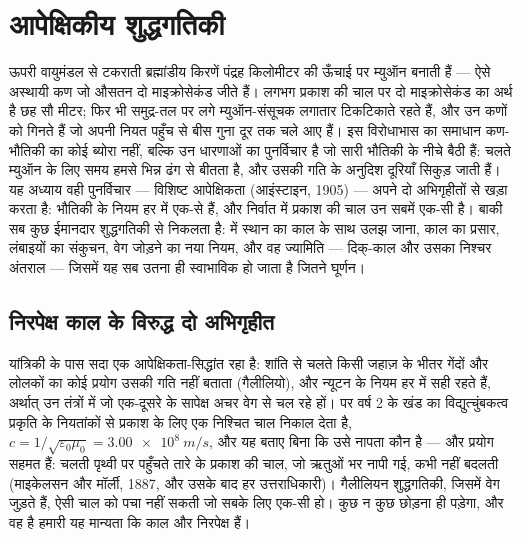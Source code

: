 \chapter{आपेक्षिकीय शुद्धगतिकी}\label{ch:b3:relativistic-kinematics}

ऊपरी वायुमंडल से टकराती ब्रह्मांडीय किरणें पंद्रह किलोमीटर की ऊँचाई पर
म्युऑन बनाती हैं --- ऐसे अस्थायी कण जो औसतन दो माइक्रोसेकंड जीते हैं।
लगभग प्रकाश की चाल पर दो माइक्रोसेकंड का अर्थ है
छह सौ मीटर; फिर भी समुद्र-तल पर लगे म्युऑन-संसूचक लगातार टिकटिकाते
रहते हैं, और उन कणों को गिनते हैं जो अपनी नियत पहुँच से बीस गुना दूर
तक चले आए हैं। इस विरोधाभास का समाधान कण-भौतिकी का कोई ब्योरा नहीं,
बल्कि उन धारणाओं का पुनर्विचार है जो सारी भौतिकी के नीचे बैठी हैं: चलते
म्युऑन के लिए समय हमसे भिन्न ढंग से बीतता है, और उसकी गति के अनुदिश
दूरियाँ सिकुड़ जाती हैं। यह अध्याय वही पुनर्विचार --- विशिष्ट
आपेक्षिकता (आइंस्टाइन, 1905) --- अपने दो अभिगृहीतों से खड़ा करता है:
भौतिकी के नियम हर  में एक-से हैं, और निर्वात में
प्रकाश की चाल उन सबमें एक-सी है। बाकी सब कुछ ईमानदार
शुद्धगतिकी से निकलता है:  में स्थान का काल के साथ उलझ जाना, काल का प्रसार, लंबाइयों का
संकुचन, वेग जोड़ने का नया नियम, और वह ज्यामिति --- दिक्-काल और उसका
निश्चर अंतराल --- जिसमें यह सब उतना ही स्वाभाविक हो जाता है जितने
घूर्णन।

\section{निरपेक्ष काल के विरुद्ध दो अभिगृहीत}

\begin{remark}[संघर्ष कहाँ से आता है]\label{rem:b3:relativistic-kinematics:conflict}
यांत्रिकी के पास सदा एक आपेक्षिकता-सिद्धांत रहा है: शांति से
चलते किसी जहाज़ के भीतर गेंदों और लोलकों का कोई प्रयोग उसकी गति नहीं
बताता (गैलीलियो), और न्यूटन के नियम हर \emph{} में सही रहते हैं, अर्थात् उन तंत्रों में जो एक-दूसरे के सापेक्ष
अचर वेग से चल रहे हों। पर वर्ष 2 के खंड का विद्युत्चुंबकत्व प्रकृति के
नियतांकों से प्रकाश के लिए एक निश्चित चाल निकाल देता है,
$c = 1/\sqrt{\varepsilon_0\mu_0} =
\qty{3.00e8}{m/s}$, और यह बताए बिना कि उसे नापता कौन है --- और प्रयोग
सहमत हैं: चलती पृथ्वी पर पहुँचते तारे के प्रकाश की चाल, जो ऋतुओं भर
नापी गई, कभी नहीं बदलती (माइकेलसन और मॉर्ली, 1887, और उसके बाद हर
उत्तराधिकारी)। गैलीलियन
शुद्धगतिकी, जिसमें वेग जुड़ते हैं, ऐसी चाल को पचा नहीं सकती जो सबके लिए
एक-सी हो। कुछ न कुछ छोड़ना ही पड़ेगा, और वह है हमारी यह मान्यता
कि काल और  निरपेक्ष हैं।
\end{remark}

